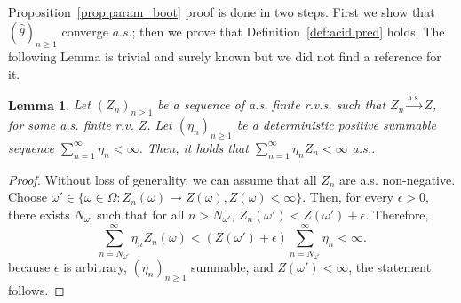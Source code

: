 \documentclass{article}
\newtheorem{lemma}{Lemma}
\theoremstyle{definition}
\renewcommand{\&}{and}
\begin{document}
Proposition~\ref{prop:param_boot} proof is done in two steps. First we show that $(\hat{\theta})_{n\geq 1}$ converge $a.s.$; then we prove that Definition~\ref{def:acid.pred} holds.  The following Lemma is trivial and surely known but we did not find a reference for it. 

\begin{lemma}\label{eq:summability} Let $(Z_n)_{n\geq 1}$ be a sequence of a.s. finite r.v.s. such that $Z_n \stackrel{\text{a.s.}}{\to} Z$, for some a.s. finite r.v. $Z$. Let $(\eta_n)_{n \geq 1}$ be a deterministic positive summable sequence $\sum_{n=1}^\infty \eta_n <\infty$. Then, it holds that $\sum_{n=1}^\infty \eta_n Z_n < \infty$ a.s.. 
\end{lemma}

\begin{proof} Without loss of generality, we can assume that all $Z_{n}$ are a.s. non-negative. Choose $\omega'\in \{\omega \in \Omega: Z_n(\omega) \to Z(\omega), Z(\omega)<\infty\}$. Then, for every $\epsilon>0$, there exists $N_{\omega'}$ such that for all $n>N_{\omega'}$, $Z_n(\omega')< Z(\omega')+\epsilon$. Therefore,
\[
\sum^{\infty}_{n=N_{\omega'}} \eta_n Z_n(\omega) < (Z(\omega')+\epsilon)\sum^{\infty}_{n=N_{\omega'}} \eta_n <\infty. 
\]
because $\epsilon$ is arbitrary, $(\eta_n)_{n \geq 1}$ summable, and $Z(\omega')<\infty$, the statement follows.
\end{proof}
\end{document}
